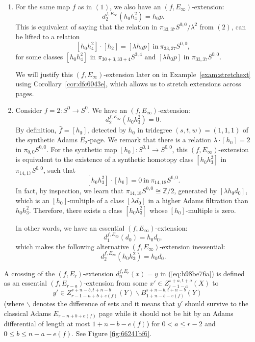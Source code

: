 \documentclass{amsart}
\numberwithin{equation}{section}
\begin{document}
\begin{example}
\begin{enumerate}
        \item For the same map $f$ as in $(1)$, we also have an $(f, E_\infty)$-extension:
        $$d_2^{f, E_\infty} (h_0h_4^2) = h_0 p.$$
        This is equivalent of saying that the relation in $\pi_{33, 37} S^{0,0}/\lambda^2$ from $(2)$, can be lifted to a relation
        $$[h_0 h_4^2] \cdot [h_2] = [\lambda h_0 p] \ \text{in} \ \pi_{33, 37} S^{0,0},$$
        for some classes $[h_0 h_4^2]$ in $\pi_{30+3, 33+4} S^{3,4}$ and $[\lambda h_0 p]$ in $\pi_{33, 37} S^{0,0}$.

        We will justify this $(f, E_\infty)$-extension later on in Example~\ref{exam:stretchext} using Corollary~\ref{cor:dfc6043e}, which allows us to stretch extensions across pages.

        \item Consider $f = 2: S^0 \rightarrow S^0$. We have an $(f, E_\infty)$-extension:
        $$d_2^{f, E_\infty} (h_0 h_3^2) = 0.$$
        By definition, $\hat{f} = [h_0]$, detected by $h_0$ in tridegree $(s,t,w) = (1,1,1)$ of the synthetic Adams $E_2$-page. We remark that there is a relation $\lambda \cdot [h_0] = 2$ in $\pi_{0,0}S^{0,0}$. For the synthetic map $[h_0]:S^{0,1} \rightarrow S^{0,0}$,
        this $(f, E_\infty)$-extension is equivalent to the existence of a synthetic homotopy class $[h_0 h_3^2]$ in $\pi_{14, 17} S^{0,0}$, such that
        $$[h_0 h_3^2] \cdot [h_0] = 0 \ \text{in} \ \pi_{14,18}S^{0,0}.$$
        In fact, by inspection, we learn that $\pi_{14,18}S^{0,0} \cong \mathbb{Z}/2$, generated by $[\lambda h_0 d_0]$, which is an $[h_0]$-multiple of a class $[\lambda d_0]$ in a higher Adams filtration than $h_0h_3^2$. Therefore, there exists a class $[h_0 h_3^2]$ whose $[h_0]$-multiple is zero.

        In other words, we have an essential $(f, E_\infty)$-extension:
        $$d_1^{f, E_\infty} (d_0) = h_0 d_0,$$
        which makes the following alternative $(f, E_\infty)$-extension inessential: 
        $$d_2^{f, E_\infty} (h_0 h_3^2) = h_0 d_0.$$
    \end{enumerate}
\end{example}



\begin{definition}\label{def:41d51149}
    A crossing of the $(f,E_r)$-extension $d_{n}^{f,E_r}(x)=y$ in (\ref{eq:b98be76a}) is defined as an essential $(f, E_{r-a})$-extension from some $x'\in Z_{r-1-a}^{s+a,t+a}(X)$ to 
    $$y'\in Z_{r-1-n+b+e(f)}^{s+n-b,t+n-b}(Y)\backslash B_{1+n-b-e(f)}^{s+n-b,t+n-b}(Y)$$
    (where $\backslash$ denotes the difference of sets and it means that $y'$ should survive to the classical Adams $E_{r-n+b+e(f)}$ page while it should not be hit by an Adams differential of length at most $1+n-b-e(f)$) for $0<a \le r-2$ and $0\le b\le n-a-e(f)$. See Figure \ref{fig:66241bf6}.
\end{definition}
\end{document}
